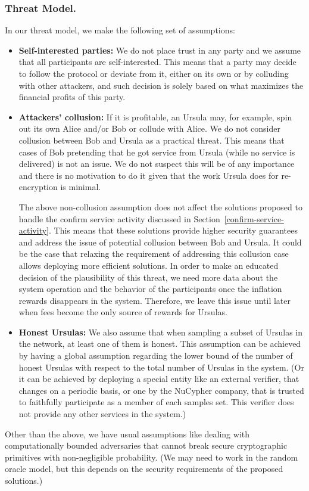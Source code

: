 \subsubsection{Threat Model.}
In our threat model, we make the following set of assumptions:
\begin{itemize}
\item {\bf Self-interested parties:} We do not place trust in any party and we assume that all participants are 
self-interested. This means that a party may decide to 
follow the protocol or deviate from it, either on its own or by colluding 
with other attackers, and such decision is solely based on what maximizes the financial profits
of this party.

\item {\bf Attackers' collusion:} If it is profitable, an Ursula may, for example, spin out  
its own Alice and/or Bob or collude with Alice. We do not consider collusion 
between Bob and Ursula as a practical threat. This means that cases of Bob pretending  
that he got service from Ursula (while no service is delivered) is not an issue. We do not 
suspect this will be of any importance and there is no motivation to do it given that 
the work Ursula does for re-encryption is minimal.

The above non-collusion assumption does not affect the solutions proposed to handle 
the confirm service activity discussed in Section~\ref{confirm-service-activity}. This 
means that these solutions provide higher 
security guarantees and address the issue of potential collusion between Bob and Ursula. 
It could be the case that relaxing the requirement of 
addressing this collusion case allows deploying more efficient solutions. 
In order to make an educated decision of the plausibility of this threat, we need 
more data about the system operation and the behavior of the participants 
once the inflation rewards disappears in the system. Therefore, we leave this 
issue until later when fees become the only source of rewards for Ursulas.

\item {\bf Honest Ursulas:} We also assume that when sampling a subset of Ursulas in the network, 
at least one of them is honest. This assumption can be achieved by 
having a global assumption regarding the lower bound of the number of 
honest Ursulas with respect to the total number of Ursulas in the system. 
(Or it can be achieved by deploying a special entity like an external verifier, 
that changes on a periodic basis, or one by the NuCypher company, that is
trusted to faithfully participate as a member of each samples set. This 
verifier does not provide any other services 
in the system.)
\end{itemize}


Other than the above, we have usual assumptions like dealing with 
computationally bounded adversaries 
that cannot break secure cryptographic primitives with non-negligible probability. 
(We may need to work in the random oracle model, but this depends on the 
security requirements of the proposed solutions.)



